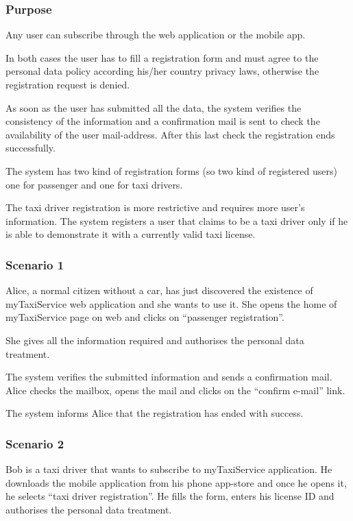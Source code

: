 \label{user-registration}
\subsubsection{Purpose}
Any user can subscribe through the web application or the mobile app.

In both cases the user has to fill a registration form and must agree to the personal data policy according his/her country privacy laws, otherwise the registration request is denied.

As soon as the user has submitted all the data, the system verifies the consistency of the information and a confirmation mail is sent to check the availability of the user mail-address.  After this last check the registration ends successfully.

The system has two kind of registration forms (so two kind of registered users) one for passenger and one for taxi drivers.

The taxi driver registration is more restrictive and requires more user's information.
The system registers a user that claims to be a taxi driver only if he is able to demonstrate it with a currently valid taxi license.


\subsubsection{Scenario 1}
Alice, a normal citizen without a car, has just discovered the existence of myTaxiService web application and she wants to use it.
She opens the home of myTaxiService page on web and clicks on ``passenger registration''.

She gives all the information required and authorises the personal data treatment.

The system verifies the submitted information and sends a confirmation mail.
Alice checks the mailbox, opens the mail and clicks on the ``confirm e-mail'' link.

The system informs Alice that the registration has ended with success.

\subsubsection{Scenario 2}
Bob is a taxi driver that wants to subscribe to myTaxiService application.
He downloads the mobile application from his phone app-store and once he opens it, he selects ``taxi driver registration''.
He fills the form, enters his license ID and authorises the personal data treatment.

